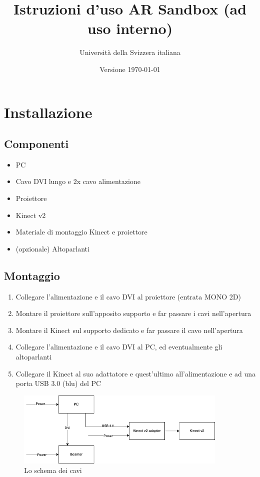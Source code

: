\documentclass[12pt]{article}
\title{Istruzioni d'uso AR Sandbox (ad uso interno)}
\author{Università della Svizzera italiana}
\date{Versione \today}
\begin{document}
\maketitle
\tableofcontents
\newpage


\section{Installazione}\label{installation}	

	\subsection{Componenti}
	
		\begin{itemize}
			\item PC
			\item Cavo DVI lungo e 2x cavo alimentazione
			\item Proiettore
			\item Kinect v2
			\item Materiale di montaggio Kinect e proiettore
			\item (opzionale) Altoparlanti
		\end{itemize}
		
		
	\subsection{Montaggio}
	
		\begin{enumerate}
			\item Collegare l'alimentazione e il cavo DVI al proiettore (entrata MONO 2D)
			\item Montare il proiettore sull'apposito supporto e far passare i cavi
			nell'apertura
			\item Montare il Kinect sul supporto dedicato e far passare il cavo nell'apertura
			\item Collegare l'alimentazione e il cavo DVI al PC, ed eventualmente gli altoparlanti
			\item Collegare il Kinect al suo adattatore e quest'ultimo all'alimentazione e ad una porta USB 3.0 (blu) del PC
		\end{enumerate}

		\begin{figure}[H]
			\centering
			\includegraphics[width=0.9\textwidth]{img/cablesScheme.png}
			\caption*{Lo schema dei cavi}
		\end{figure}
\end{document}
